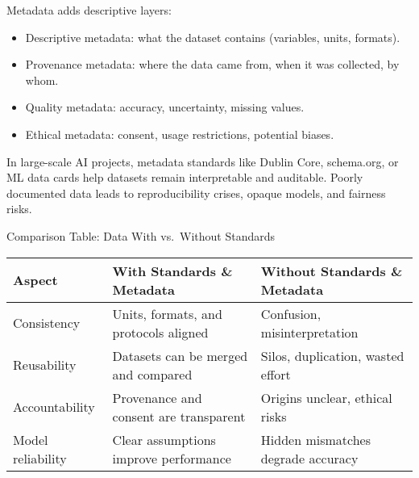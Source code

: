 \documentclass[
  letterpaper,
  DIV=11,
  numbers=noendperiod]{scrreprt}
\providecommand{\tightlist}{%
  \setlength{\itemsep}{0pt}\setlength{\parskip}{0pt}}
\begin{document}
Metadata adds descriptive layers:

\begin{itemize}
\tightlist
\item
  Descriptive metadata: what the dataset contains (variables, units,
  formats).
\item
  Provenance metadata: where the data came from, when it was collected,
  by whom.
\item
  Quality metadata: accuracy, uncertainty, missing values.
\item
  Ethical metadata: consent, usage restrictions, potential biases.
\end{itemize}

In large-scale AI projects, metadata standards like Dublin Core,
schema.org, or ML data cards help datasets remain interpretable and
auditable. Poorly documented data leads to reproducibility crises,
opaque models, and fairness risks.

Comparison Table: Data With vs.~Without Standards

\begin{longtable}[]{@{}
  >{\raggedright\arraybackslash}p{}
  >{\raggedright\arraybackslash}p{}
  >{\raggedright\arraybackslash}p{}@{}}
\toprule\noalign{}
\begin{minipage}[b]{\linewidth}\raggedright
Aspect
\end{minipage} & \begin{minipage}[b]{\linewidth}\raggedright
With Standards \& Metadata
\end{minipage} & \begin{minipage}[b]{\linewidth}\raggedright
Without Standards \& Metadata
\end{minipage} \\
\midrule\noalign{}
\endhead
\bottomrule\noalign{}
\endlastfoot
Consistency & Units, formats, and protocols aligned & Confusion,
misinterpretation \\
Reusability & Datasets can be merged and compared & Silos, duplication,
wasted effort \\
Accountability & Provenance and consent are transparent & Origins
unclear, ethical risks \\
Model reliability & Clear assumptions improve performance & Hidden
mismatches degrade accuracy \\
\end{longtable}
\end{document}
